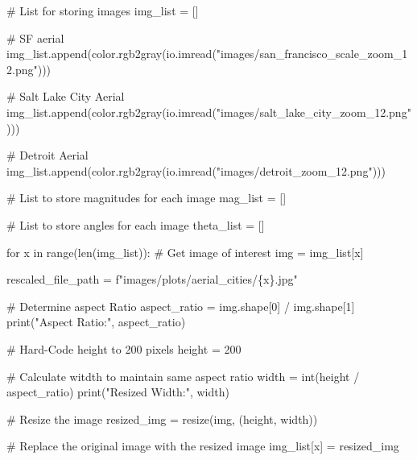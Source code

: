 \documentclass[
  letterpaper,
  DIV=11,
  numbers=noendperiod]{scrreprt}
\newenvironment{Shaded}{\begin{snugshade}}{\end{snugshade}}
\newcommand{\BuiltInTok}[1]{\textcolor[rgb]{0.00,0.23,0.31}{#1}}
\newcommand{\CommentTok}[1]{\textcolor[rgb]{0.37,0.37,0.37}{#1}}
\newcommand{\ControlFlowTok}[1]{\textcolor[rgb]{0.00,0.23,0.31}{#1}}
\newcommand{\DecValTok}[1]{\textcolor[rgb]{0.68,0.00,0.00}{#1}}
\newcommand{\KeywordTok}[1]{\textcolor[rgb]{0.00,0.23,0.31}{#1}}
\newcommand{\NormalTok}[1]{\textcolor[rgb]{0.00,0.23,0.31}{#1}}
\newcommand{\OperatorTok}[1]{\textcolor[rgb]{0.37,0.37,0.37}{#1}}
\newcommand{\SpecialCharTok}[1]{\textcolor[rgb]{0.37,0.37,0.37}{#1}}
\newcommand{\SpecialStringTok}[1]{\textcolor[rgb]{0.13,0.47,0.30}{#1}}
\newcommand{\StringTok}[1]{\textcolor[rgb]{0.13,0.47,0.30}{#1}}
\begin{document}
\begin{Shaded}
\begin{Highlighting}[]
\CommentTok{\# List for storing images}
\NormalTok{img\_list }\OperatorTok{=}\NormalTok{ []}

\CommentTok{\# SF aerial}
\NormalTok{img\_list.append(color.rgb2gray(io.imread(}\StringTok{"images/san\_francisco\_scale\_zoom\_12.png"}\NormalTok{)))}

\CommentTok{\# Salt Lake City Aerial}
\NormalTok{img\_list.append(color.rgb2gray(io.imread(}\StringTok{"images/salt\_lake\_city\_zoom\_12.png"}\NormalTok{)))}

\CommentTok{\# Detroit Aerial}
\NormalTok{img\_list.append(color.rgb2gray(io.imread(}\StringTok{"images/detroit\_zoom\_12.png"}\NormalTok{)))}

\CommentTok{\# List to store magnitudes for each image}
\NormalTok{mag\_list }\OperatorTok{=}\NormalTok{ []}

\CommentTok{\# List to store angles for each image}
\NormalTok{theta\_list }\OperatorTok{=}\NormalTok{ []}


\ControlFlowTok{for}\NormalTok{ x }\KeywordTok{in} \BuiltInTok{range}\NormalTok{(}\BuiltInTok{len}\NormalTok{(img\_list)):}
    \CommentTok{\# Get image of interest}
\NormalTok{    img }\OperatorTok{=}\NormalTok{ img\_list[x]}
    
\NormalTok{    rescaled\_file\_path }\OperatorTok{=} \SpecialStringTok{f"images/plots/aerial\_cities/}\SpecialCharTok{\{}\NormalTok{x}\SpecialCharTok{\}}\SpecialStringTok{.jpg"}
    
    \CommentTok{\# Determine aspect Ratio}
\NormalTok{    aspect\_ratio }\OperatorTok{=}\NormalTok{ img.shape[}\DecValTok{0}\NormalTok{] }\OperatorTok{/}\NormalTok{ img.shape[}\DecValTok{1}\NormalTok{]}
    \BuiltInTok{print}\NormalTok{(}\StringTok{"Aspect Ratio:"}\NormalTok{, aspect\_ratio)}
    
    \CommentTok{\# Hard{-}Code height to 200 pixels}
\NormalTok{    height }\OperatorTok{=} \DecValTok{200}
    
    \CommentTok{\# Calculate witdth to maintain same aspect ratio}
\NormalTok{    width }\OperatorTok{=} \BuiltInTok{int}\NormalTok{(height }\OperatorTok{/}\NormalTok{ aspect\_ratio)}
    \BuiltInTok{print}\NormalTok{(}\StringTok{"Resized Width:"}\NormalTok{, width)}
    
    \CommentTok{\# Resize the image}
\NormalTok{    resized\_img }\OperatorTok{=}\NormalTok{ resize(img, (height, width))}
    
    \CommentTok{\# Replace the original image with the resized image}
\NormalTok{    img\_list[x] }\OperatorTok{=}\NormalTok{ resized\_img}
    

\end{Highlighting}
\end{Shaded}
\end{document}
